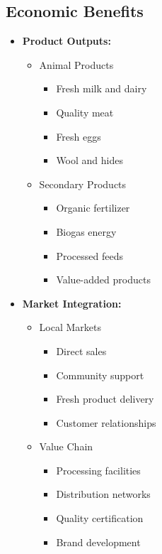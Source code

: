 \subsection{Economic Benefits}
\begin{itemize}
    \item \textbf{Product Outputs:}
    \begin{itemize}
        \item Animal Products
        \begin{itemize}
            \item Fresh milk and dairy
            \item Quality meat
            \item Fresh eggs
            \item Wool and hides
        \end{itemize}
        
        \item Secondary Products
        \begin{itemize}
            \item Organic fertilizer
            \item Biogas energy
            \item Processed feeds
            \item Value-added products
        \end{itemize}
    \end{itemize}
    
    \item \textbf{Market Integration:}
    \begin{itemize}
        \item Local Markets
        \begin{itemize}
            \item Direct sales
            \item Community support
            \item Fresh product delivery
            \item Customer relationships
        \end{itemize}
        
        \item Value Chain
        \begin{itemize}
            \item Processing facilities
            \item Distribution networks
            \item Quality certification
            \item Brand development
        \end{itemize}
    \end{itemize}
\end{itemize}

